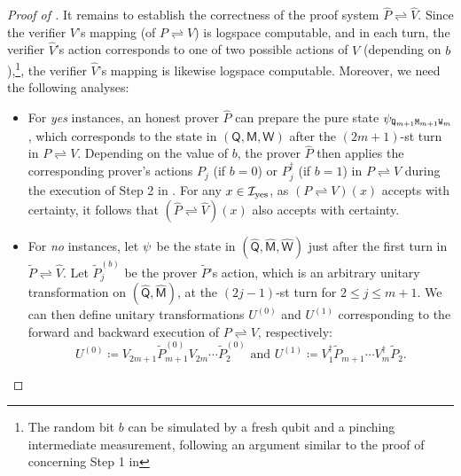\documentclass[10pt,a4paper]{article}
\numberwithin{equation}{section}
\numberwithin{figure}{section}
\newcommand{\protocol}[2]{{#1}\!\rightleftharpoons\!{#2}}
\let\ket\relax\DeclarePairedDelimiter\ket{\lvert}{\rangle}
\newcommand{\yes}{{\rm yes}}
\newcommand{\calI}{\mathcal{I}}
\newcommand{\sfM}{\mathsf{M}}
\newcommand{\sfQ}{\mathsf{Q}}
\newcommand{\sfW}{\mathsf{W}}
\newcommand{\ttM}{\mathtt{M}}
\newcommand{\ttQ}{\mathtt{Q}}
\newcommand{\ttW}{\mathtt{W}}
\newcommand{\hatP}{\widehat{P}}
\newcommand{\hatV}{\widehat{V}}
\begin{document}
\begin{proof}[Proof of ]
    \vspace{1em}
    It remains to establish the correctness of the proof system $\protocol{\hatP}{\hatV}$. Since the verifier $V$'s mapping (of $\protocol{P}{V}$) is logspace computable, and in each turn, the verifier $\hatV$'s action corresponds to one of two possible actions of $V$ (depending on $b$),\footnote{The random bit $b$ can be simulated by a fresh qubit and a pinching intermediate measurement, following an argument similar to the proof of  concerning Step 1 in }, the verifier $\hatV$'s mapping is likewise logspace computable. Moreover, we need the following analyses: 
    \begin{itemize}[leftmargin=1.5em]
        \item For \textit{yes} instances, an honest prover $\hatP$ can prepare the pure state $\ket{\psi_{\ttQ_{m+1}\ttM_{m+1}\ttW_m}}$, which corresponds to the state in $(\sfQ,\sfM,\sfW)$ after the $(2m+1)$-st turn in $\protocol{P}{V}$. Depending on the value of $b$, the prover $\hatP$ then applies the corresponding prover's actions $P_j$ (if $b=0$) or $P^{\dagger}_j$ (if $b=1$) in $\protocol{P}{V}$ during the execution of Step 2 in . For any $x\in\calI_{\yes}$, as $(\protocol{P}{V})(x)$ accepts with certainty, it follows that $(\protocol{\hatP}{\hatV})(x)$ also accepts with certainty. 
        
        \item For \textit{no} instances, let $\ket{\psi}$ be the state in $(\widehat{\sfQ},\widehat{\sfM},\widehat{\sfW})$ just after the first turn in $\protocol{\widetilde{P}}{\hatV}$. Let $\widetilde{P}^{(b)}_j$ be the prover $\widetilde{P}$'s action, which is an arbitrary unitary transformation on $(\widehat{\sfQ},\widehat{\sfM})$, at the $(2j-1)$-st turn for $2 \leq j \leq m+1$. We can then define unitary transformations $U^{(0)}$ and $U^{(1)}$ corresponding to the forward and backward execution of $\protocol{P}{V}$, respectively: 
        \begin{equation}
            \label{eq:parallelization-unitaries-def}
            U^{(0)} \coloneqq V_{2m+1} \widetilde{P}^{(0)}_{m+1} V_{2m} \cdots \widetilde{P}^{(0)}_2 \text{ and } U^{(1)} \coloneqq V_1^{\dagger} \widetilde{P}_{m+1} \cdots V_m^{\dagger} \widetilde{P}_2. 
        \end{equation}


\end{itemize}
\end{proof}
\end{document}
